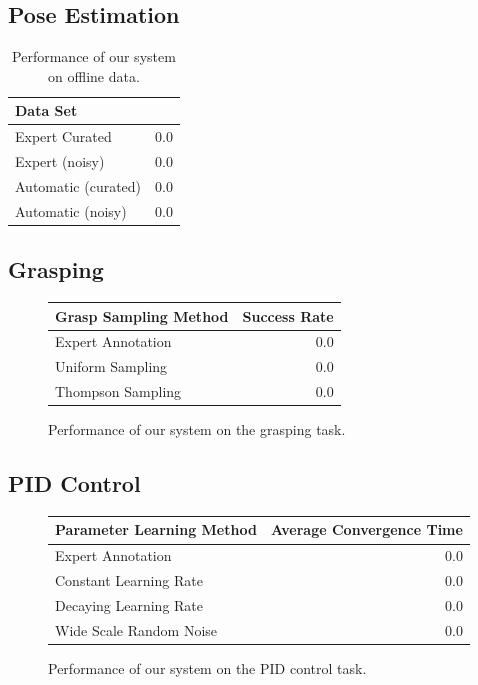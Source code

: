\documentclass[conference]{IEEEtran}
\begin{document}
\subsection{Pose Estimation}

\begin{table}
  \caption{Performance of our system on offline data.}
  \begin{center}
  \begin{tabular}{lr}
\toprule
  Data Set            &  \\ 
\midrule
  Expert Curated      & 0.0 \\ 
  Expert (noisy)      & 0.0 \\ 
  Automatic (curated) & 0.0 \\ 
  Automatic (noisy)   & 0.0\\
\bottomrule
  \end{tabular}

  \end{center}
\end{table}


\subsection{Grasping}

\begin{figure}
  \begin{center}
  \begin{tabular}{lr}
  \toprule
  Grasp Sampling Method & Success Rate \\ 
  \midrule
  Expert Annotation & 0.0 \\ 
  Uniform Sampling & 0.0 \\ 
  Thompson Sampling & 0.0 \\
  \bottomrule
  \end{tabular}
  \caption{Performance of our system on the grasping task.}
  \end{center}
\end{figure}

\subsection{PID Control}

\begin{figure}
  \begin{center}
  \begin{tabular}{lr}
    \toprule
  Parameter Learning Method & Average Convergence Time \\ 
  \midrule
  Expert Annotation & 0.0 \\ 
  Constant Learning Rate & 0.0 \\
  Decaying Learning Rate & 0.0 \\
  Wide Scale Random Noise & 0.0 \\
  \bottomrule
  \end{tabular}
  \caption{Performance of our system on the PID control task.}
  \end{center}
\end{figure}
\end{document}
